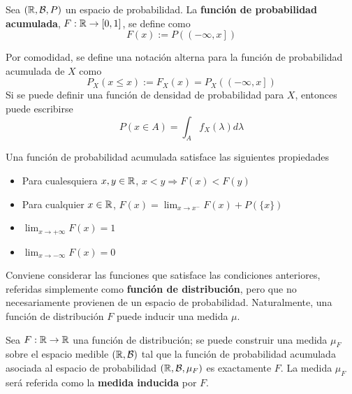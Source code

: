 \begin{definicion}%
Sea $(\mathbb{R},\mathcal{B},P)$ un espacio de probabilidad. La \textbf{función de probabilidad acumulada}, $F : \mathbb{R} \rightarrow [0,1]$, se define como
\begin{equation*}
F (x) := P\left( \left(-\infty,x \right] \right)
\end{equation*}
\end{definicion}

Por comodidad, se define una notación alterna para la función de probabilidad acumulada de $X$ como
\begin{equation}
P_X(x\leq x) := F_X(x) = P_X\left( \left( -\infty,x \right] \right)
\end{equation}
Si se puede definir una función de densidad de probabilidad para $X$, entonces puede escribirse
\begin{equation}
P(x\in A) = \int_A f_X(\lambda) d\lambda 
\end{equation}

Una función de probabilidad acumulada satisface las siguientes propiedades
\begin{itemize}
\item Para cualesquiera $x,y\in \mathbb{R}$, $x < y \Rightarrow F(x) < F(y)$
\item Para cualquier $x\in\mathbb{R}$, $F(x) = \lim_{x\rightarrow x^{-}} F(x) + P(\{x\})$
\item $\lim_{x\rightarrow +\infty} F(x) = 1$
\item $\lim_{x\rightarrow -\infty} F(x) = 0$
\end{itemize}

Conviene considerar las funciones que satisface las condiciones anteriores, referidas simplemente como \textbf{función de distribución}, pero que no necesariamente provienen de un espacio de probabilidad. Naturalmente, una función de distribución $F$ puede inducir una medida $\mu$.

\begin{proposicion}
Sea $F:\mathbb{R} \rightarrow \mathbb{R}$ una función de distribución; se puede construir una medida $\mu_F$ sobre el espacio medible $(\mathbb{R}, \mathcal{B})$ tal que la función de probabilidad acumulada asociada al espacio de probabilidad $(\mathbb{R}, \mathcal{B}, \mu_F)$ es exactamente $F$.
%
La medida $\mu_F$ será referida como la \textbf{medida inducida} por $F$.
\end{proposicion}

